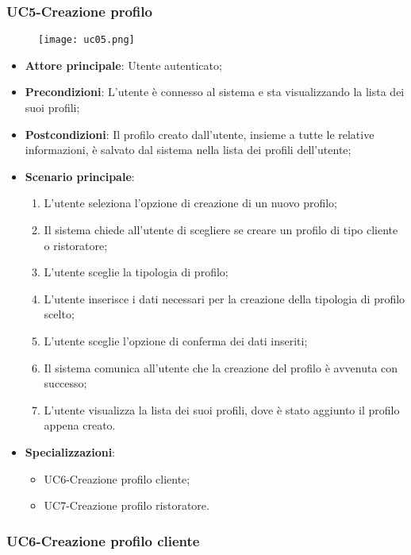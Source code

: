 \pagebreak
\subsubsection{UC5-Creazione profilo}
\begin{figure}[h] \texttt{[image: uc05.png]} \end{figure}

\begin{itemize}
\item \textbf{Attore principale}: Utente autenticato;
\item \textbf{Precondizioni}: L'utente è connesso al sistema e sta visualizzando la lista dei suoi profili;
\item \textbf{Postcondizioni}: Il profilo creato dall'utente, insieme a tutte le relative informazioni, è salvato dal sistema nella lista dei profili dell'utente;
\item \textbf{Scenario principale}:
\begin{enumerate}
\item L'utente seleziona l'opzione di creazione di un nuovo profilo;
\item Il sistema chiede all'utente di scegliere se creare un profilo di tipo cliente o ristoratore;
\item L'utente sceglie la tipologia di profilo;
\item L'utente inserisce i dati necessari per la creazione della tipologia di profilo scelto;
\item L'utente sceglie l'opzione di conferma dei dati inseriti;
\item Il sistema comunica all'utente che la creazione del profilo è avvenuta con successo;
\item L'utente visualizza la lista dei suoi profili, dove è stato aggiunto il profilo appena creato.
\end{enumerate}
\item \textbf{Specializzazioni}:
\begin{itemize}
\item UC6-Creazione profilo cliente;
\item UC7-Creazione profilo ristoratore.
\end{itemize}
\end{itemize}

\subsubsection{UC6-Creazione profilo cliente}

